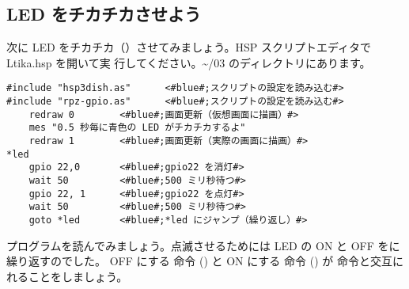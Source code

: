 \subsection{LED をチカチカさせよう}

次に LED をチカチカ（）させてみましょう。HSP スクリプトエディタで Ltika.hsp を開いて実
行してください。\textasciitilde /03 のディレクトリにあります。\\

\begin{lstlisting}[caption=\textasciitilde/03/Ltika.hsp,label=Ltika.hsp]
#include "hsp3dish.as"		<#blue#;スクリプトの設定を読み込む#>
#include "rpz-gpio.as"		<#blue#;スクリプトの設定を読み込む#>
	redraw 0		<#blue#;画面更新（仮想画面に描画）#>
	mes "0.5 秒毎に青色の LED がチカチカするよ"
	redraw 1		<#blue#;画面更新（実際の画面に描画）#>
*led
	gpio 22,0		<#blue#;gpio22 を消灯#>
	wait 50 		<#blue#;500 ミリ秒待つ#>
	gpio 22, 1 		<#blue#;gpio22 を点灯#>
	wait 50 		<#blue#;500 ミリ秒待つ#>
	goto *led 		<#blue#;*led にジャンプ（繰り返し）#>
\end{lstlisting}

プログラムを読んでみましょう。点滅させるためには LED の ON と OFF をに繰り返すのでした。
OFF にする  命令 () と ON にする  命令 () が  命令と交互に
れることをしましょう。\\

\begin{tcolorbox}[title=\useOmetoi]
\begin{enumerate}
\end{enumerate}
\end{tcolorbox}
